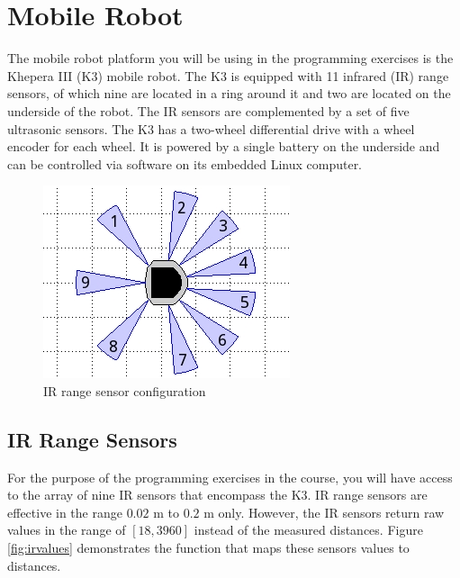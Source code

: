 \documentclass[10pt]{article}
\begin{document}
\section{Mobile Robot}

The mobile robot platform you will be using in the programming exercises is the Khepera III (K3) mobile robot. The K3 is equipped with 11 infrared (IR) range sensors, of which nine are located in a ring around it and two are located on the underside of the robot. The IR sensors are complemented by a set of five ultrasonic sensors. The K3 has a two-wheel differential drive with a wheel encoder for each wheel. It is powered by a single battery on the underside and can be controlled via software on its embedded Linux computer.
\begin{figure}[h]
 \centering
 \includegraphics[bb=0 0 274 214,scale=0.6]{k3sensors.png}
 \caption{IR range sensor configuration}
 \label{fig:k3sensors}
\end{figure}




\subsection{IR Range Sensors}\label{irprox}
For the purpose of the programming exercises in the course, you will have access to the array of nine IR sensors that encompass the K3. IR range sensors are effective in the range $0.02$ m to $0.2$ m only. However, the IR sensors return raw values in the range of $[18,3960]$ instead of the measured distances. Figure \ref{fig:irvalues} demonstrates the function that maps these sensors values to distances.
\end{document}
